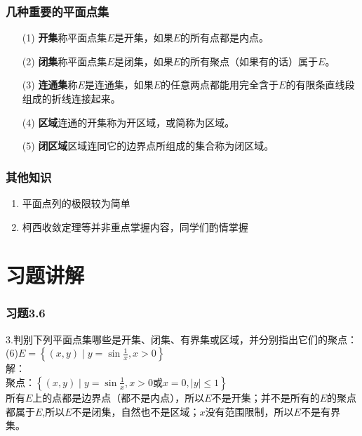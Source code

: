 \documentclass[xetex]{beamer}
\begin{document}
\begin{frame}
    \frametitle{几种重要的平面点集} 
    \begin{enumerate}
 	\item[(1)]\textbf{开集}\qquad 称平面点集$E$是开集，如果$E$的所有点都是内点。
 	\item[(2)]\textbf{闭集}\qquad 称平面点集$E$是闭集，如果$E$的所有聚点（如果有的话）属于$E$。
 	\item[(3)]\textbf{连通集}\qquad 称$E$是连通集，如果$E$的任意两点都能用完全含于$E$的有限条直线段组成的折线连接起来。
 	\item[(4)]\textbf{区域}\qquad 连通的开集称为开区域，或简称为区域。
 	\item[(5)]\textbf{闭区域}\qquad 区域连同它的边界点所组成的集合称为闭区域。
    \end{enumerate}
  
\end{frame}

\begin{frame}
    \frametitle{其他知识} 
  \begin{enumerate}
\item 平面点列的极限较为简单
\item 柯西收敛定理等并非重点掌握内容，同学们酌情掌握
	
    \end{enumerate}
	
\end{frame}

\section{习题讲解}
\begin{frame}
    \frametitle{习题3.6} 
   3.判别下列平面点集哪些是开集、闭集、有界集或区域，并分别指出它们的聚点：\\
	(6)$E=\left\{(x,y)\mid y = \sin\frac{1}{x},x>0 \right\}$ 
	\\解：\\聚点：$\left\{(x,y)\mid y = \sin\frac{1}{x},x>0 \mbox{或}x=0,|y|\le 1\right\}$\\
所有$E$上的点都是边界点（都不是内点），所以$E$不是开集；并不是所有的$E$的聚点都属于$E$,所以$E$不是闭集，自然也不是区域；$x$没有范围限制，所以$E$不是有界集。
\end{frame}
\end{document}
